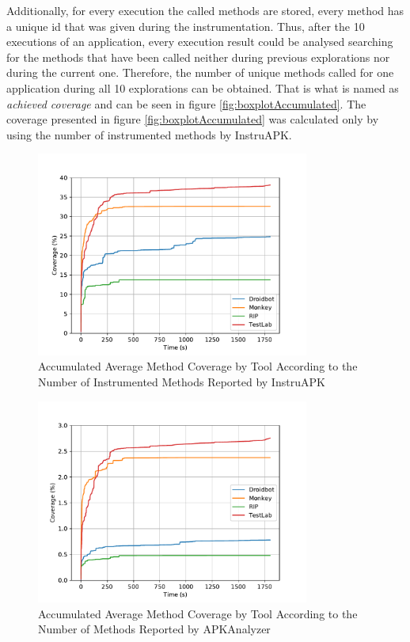 Additionally, for every execution the called methods are stored, every method has a unique id that was given during the instrumentation. Thus, after the 10 executions of an application, every execution result could be analysed searching for the methods that have been called neither during previous explorations nor during the current one. Therefore, the number of unique methods called for one application during all 10 explorations can be obtained. That is what is named as \textit{achieved coverage} and can be seen in figure \ref{fig:boxplotAccumulated}. The coverage presented in figure \ref{fig:boxplotAccumulated} was calculated only by using the number of instrumented methods by InstruAPK. 

\begin{figure}[h]
\centering
\includegraphics[width=0.8\textwidth]{../Figures/averageCoverageInstruAPK.pdf}
\caption{Accumulated Average Method Coverage by Tool According to the Number of Instrumented Methods Reported by InstruAPK}\label{fig:averageCoverageInstruAPK}
\end{figure}

\begin{figure}[h]
\centering
\includegraphics[width=0.8\textwidth]{../Figures/averageCoverageAPKAnalyzer.pdf}
\caption{Accumulated Average Method Coverage by Tool According to the Number of Methods Reported by APKAnalyzer}\label{fig:averageCoverageAPKAnalyzer}
\end{figure}

